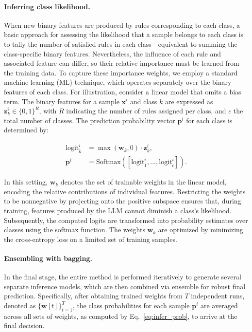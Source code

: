 \paragraph{Inferring class likelihood.} When new binary features are produced by rules corresponding to each class, a basic approach for assessing the likelihood that a sample belongs to each class is to tally the number of satisfied rules in each class—equivalent to summing the class-specific binary features. Nevertheless, the influence of each rule and associated feature can differ, so their relative importance must be learned from the training data. To capture these importance weights, we employ a standard machine learning (ML) technique, which operates separately over the binary features of each class. For illustration, consider a linear model that omits a bias term. The binary features for a sample $\mathbf{x}^i$ and class $k$ are expressed as $\mathbf{z}_k^i \in \{0, 1\}^R$, with $R$ indicating the number of rules assigned per class, and $c$ the total number of classes. The prediction probability vector $\mathbf{p}^i$ for each class is determined by:

\begin{align}
\text{logit}_k^i &= \max(\mathbf{w}_k, 0) \cdot \mathbf{z}_k^i, \nonumber \\
\mathbf{p}^i &= \text{Softmax}({[\text{logit}_{1}^i, ..., \text{logit}_{c}^i]}). \label{eq:infer_prob}
\end{align}

In this setting, $\mathbf{w}_k$ denotes the set of trainable weights in the linear model, encoding the relative contributions of individual features. Restricting the weights to be nonnegative by projecting onto the positive subspace ensures that, during training, features produced by the LLM cannot diminish a class's likelihood. Subsequently, the computed logits are transformed into probability estimates over classes using the softmax function. The weights $\mathbf{w}_k$ are optimized by minimizing the cross-entropy loss on a limited set of training samples.

\vspace*{-0.12in}
\paragraph{Ensembling with bagging.} In the final stage, the entire method is performed iteratively to generate several separate inference models, which are then combined via ensemble for robust final prediction. Specifically, after obtaining trained weights from $T$ independent runs, denoted as $\{\mathbf{w}[t]\}_{t=1}^T$, the class probabilities for each sample $\mathbf{p}^i$ are averaged across all sets of weights, as computed by Eq.~\ref{eq:infer_prob}, to arrive at the final decision.

